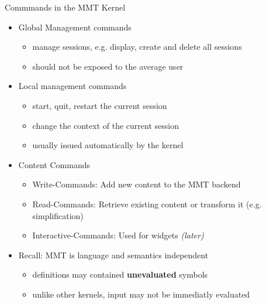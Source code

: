 \documentclass{beamer}
\begin{document}
    \begin{frame}{Commmands in the MMT Kernel}
        \begin{itemize}
            \item Global Management commands
            \begin{itemize}
                \item manage sessions, e.g. display, create and delete all sessions
                \item should not be exposed to the average user
            \end{itemize}
            \item Local management commands
            \begin{itemize}
                \item start, quit, restart the current session
                \item change the context of the current session
                \item usually issued automatically by the kernel
            \end{itemize}
           \item Content Commands
            \begin{itemize}
                \item Write-Commands: Add new content to the MMT backend
                \item Read-Commands: Retrieve existing content or transform it (e.g. simplification)
                \item Interactive-Commands: Used for widgets \textit{(later)}
            \end{itemize}
            \item Recall: MMT is language and semantics independent
            \begin{itemize}
                \item definitions may contained \textbf{unevaluated} symbols
                \item unlike other kernels, input may not be immediatly evaluated
            \end{itemize}
        \end{itemize}
    \end{frame}
\end{document}
